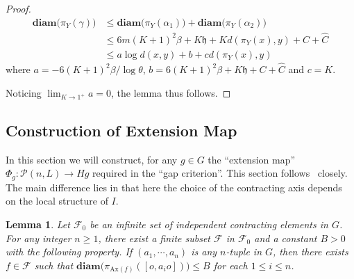 \documentclass{amsart}
\numberwithin{thm}{section}
\numberwithin{figure}{section}
\newtheorem{lem}[thm]{Lemma}
\theoremstyle{definition}
\theoremstyle{definition}
\theoremstyle{remark}
\newcommand{\ax}{\mathrm{Ax}}
\newcommand{\diam }[1]{{\textbf{diam}\big(#1\big)}}
\numberwithin{equation}{section}
\theoremstyle{plain}
\begin{document}
\begin{proof}
$$\begin{aligned}
		\diam{\pi_Y(\gamma)} &\le \diam{\pi_Y(\alpha_1)} + \diam{\pi_Y(\alpha_2)}\\
		&\le 6m (K+1)^2 \beta + K \mathfrak h + K d(\pi_Y(x), y) + C + \hat C\\
		&\le a \log d(x, y)  +b + c d(\pi_Y(x), y) 
	\end{aligned}$$
	where $a = -{6(K+1)^2 \beta}/{\log \theta}$, $b = {6(K+1)^2 \beta} + K \mathfrak h + C + \hat C$ and $c = K$. 

    
    Noticing  $\lim_{K\to 1^+} a = 0$, the lemma thus follows.
\end{proof}

\subsection{Construction of Extension Map}
\label{subsec:extensionmap}
In this section we will construct, for any $g \in G$ the ``extension map'' $\Phi_g \colon \mathcal{P}(n, L) \to Hg$ required in the ``gap criterion''.
This section follows~\cite{DY24:GrowthTight} closely. The main difference lies in that here the choice of the contracting axis depends on the local structure of $I$.

\begin{lem}\label{BddProjLem}
	Let $\mathcal{F}_0$ be an infinite set of   independent contracting elements in $G$. For any integer $n\ge 1$, there exist a finite subset $\mathcal{F}$ in  $\mathcal{F}_0$   and a constant $B>0$ with the following property. If $(a_1,\cdots, a_n)$ is any $n$-tuple in $G$, then there exists $f\in \mathcal F$ such that $\diam{\pi_{\ax (f)}([o, a_i o])} \le B$ for each $1\le i\le n$.
\end{lem}
\end{document}
